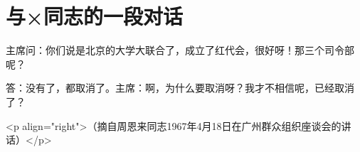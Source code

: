 \section[与×同志的一段对话（一九六七年四月）]{与×同志的一段对话}


主席问：你们说是北京的大学大联合了，成立了红代会，很好呀！那三个司令部呢？

答：没有了，都取消了。主席：啊，为什么要取消呀？我才不相信呢，已经取消了？

<p align="right">（摘自周恩来同志1967年4月18日在广州群众组织座谈会的讲话）</p>


